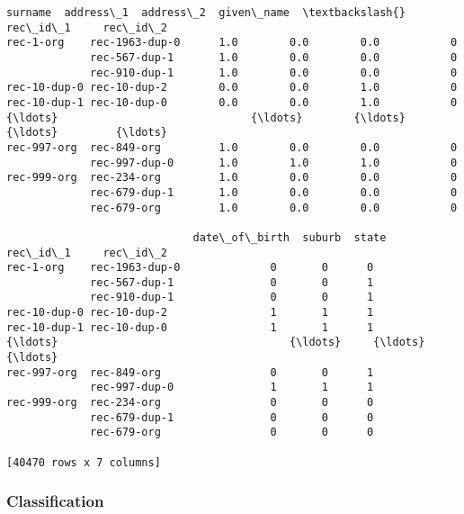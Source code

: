 \documentclass{article}
\begin{document}
    \begin{Verbatim}[commandchars=\\\{\}]

\end{Verbatim}
\begin{Verbatim}[commandchars=\\\{\}]
                             surname  address\_1  address\_2  given\_name  \textbackslash{}
rec\_id\_1     rec\_id\_2                                                    
rec-1-org    rec-1963-dup-0      1.0        0.0        0.0           0   
             rec-567-dup-1       1.0        0.0        0.0           0   
             rec-910-dup-1       1.0        0.0        0.0           0   
rec-10-dup-0 rec-10-dup-2        0.0        0.0        1.0           0   
rec-10-dup-1 rec-10-dup-0        0.0        0.0        1.0           0   
{\ldots}                              {\ldots}        {\ldots}        {\ldots}         {\ldots}   
rec-997-org  rec-849-org         1.0        0.0        0.0           0   
             rec-997-dup-0       1.0        1.0        1.0           0   
rec-999-org  rec-234-org         1.0        0.0        0.0           0   
             rec-679-dup-1       1.0        0.0        0.0           0   
             rec-679-org         1.0        0.0        0.0           0   

                             date\_of\_birth  suburb  state  
rec\_id\_1     rec\_id\_2                                      
rec-1-org    rec-1963-dup-0              0       0      0  
             rec-567-dup-1               0       0      1  
             rec-910-dup-1               0       0      1  
rec-10-dup-0 rec-10-dup-2                1       1      1  
rec-10-dup-1 rec-10-dup-0                1       1      1  
{\ldots}                                    {\ldots}     {\ldots}    {\ldots}  
rec-997-org  rec-849-org                 0       0      1  
             rec-997-dup-0               1       1      1  
rec-999-org  rec-234-org                 0       0      0  
             rec-679-dup-1               0       0      0  
             rec-679-org                 0       0      0  

[40470 rows x 7 columns]
\end{Verbatim}
    \hypertarget{classification}{%
\subsubsection{Classification}\label{classification}}
\end{document}
